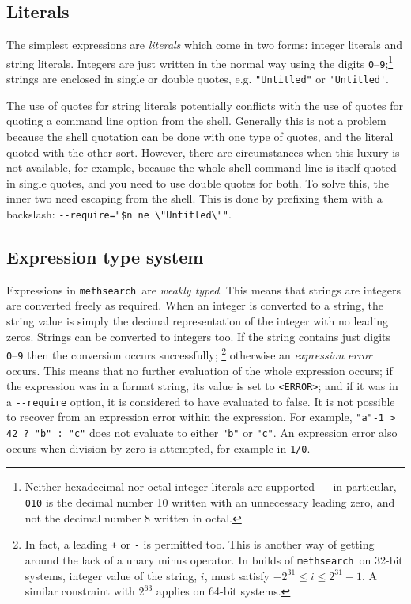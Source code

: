 \documentclass[a4paper,11pt,oneside]{book}
\def\textitidx#1{\textit{#1}\index{#1}}
\def\methsearch{\texttt{meth\-search}}
\begin{document}

\subsection{Literals}\label{lits}

The simplest expressions are \textitidx{literals} which come in two forms:
integer literals and string literals.  Integers are just written in the normal way using the digits
\verb+0+--\verb+9+;\footnote{Neither hexadecimal nor octal integer literals
are supported --- in particular, \verb+010+ is the decimal number 10 written
with an unnecessary leading zero, and not the decimal number 8 written in 
octal.}  strings are enclosed in single or double quotes, e.g. 
\verb+"Untitled"+ or \verb+'Untitled'+.

The use of quotes for string literals potentially conflicts with
the use of quotes for quoting a command line option from the 
shell.  Generally this is not a 
problem because the shell quotation can be done with one type of quotes,
and the literal quoted with the other sort.  
However, there are circumstances when this luxury is not available, 
for example, because the whole shell command
line is itself quoted in single quotes, and you need to use double quotes for 
both.  To solve this, the inner two
need escaping  
from the shell.  This is done by prefixing them with 
a backslash: 
\verb+--require="$n ne \"Untitled\""+.

\subsection{Expression type system}

Expressions in \methsearch\ are \textit{weakly typed}. 
This means that strings are integers are converted freely as required.
When an integer is converted to a string, the string value is simply the
decimal representation of the integer with no leading zeros.  
Strings can be converted to integers too.  If the string contains just
digits \verb+0+--\verb+9+ then the conversion occurs successfully;%
\footnote{In fact, a leading \verb-+- or \verb+-+ is permitted too.  
This is another way of getting around the lack of a unary minus operator.%
  In builds of \methsearch\ on 32-bit
systems, integer value of the string, $i$, must satisfy 
$-2^{31} \le i \le 2^{31}-1$.  
A similar constraint with $2^{63}$ applies on 64-bit systems.}
otherwise an \textitidx{expression error} occurs.  
This means that no further evaluation
of the whole expression occurs; if the expression was in a format string,
its value is set to \verb+<ERROR>+; and if it was in a \verb+--require+ option,
it is considered to have evaluated to false.  It is not possible to recover
from an expression error within the expression.  For example, 
\verb+"a"-1 > 42 ? "b" : "c"+ does not evaluate to either 
\verb+"b"+ or \verb+"c"+.
An expression error also occurs when division by zero is attempted,%
 for example in \verb+1/0+.
\end{document}
